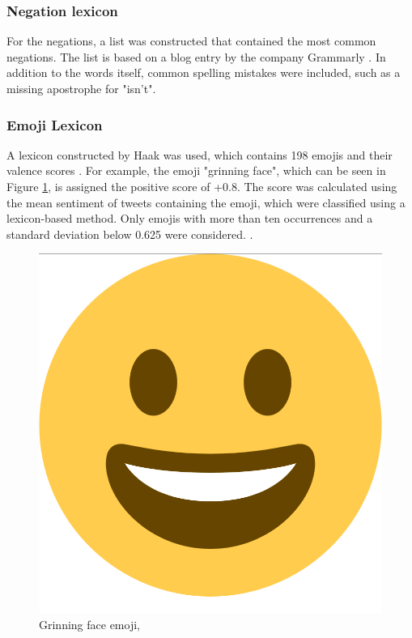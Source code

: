 \subsubsection{Negation lexicon}
For the negations, a list was constructed that contained the most common negations. The list is based on a blog entry by the company Grammarly \cite{negations}. In addition to the words itself, common spelling mistakes were included, such as a missing apostrophe for "isn't".

\subsubsection{Emoji Lexicon}
A lexicon constructed by Haak was used, which contains 198 emojis and their valence scores \cite{haak_dataset}. For example, the emoji "grinning face", which can be seen in Figure \ref{fig:emoji}, is assigned the positive score of +0.8. The score was calculated using the mean sentiment of tweets containing the emoji, which were classified using a lexicon-based method. Only emojis with more than ten occurrences and a standard deviation below 0.625 were considered. \cite{haak_article}.

\begin{figure}
    \centering
    \includegraphics[scale=0.05]{Images/emoji_smile.png}
    \caption{Grinning face emoji, }
    \label{fig:emoji}
\end{figure}



